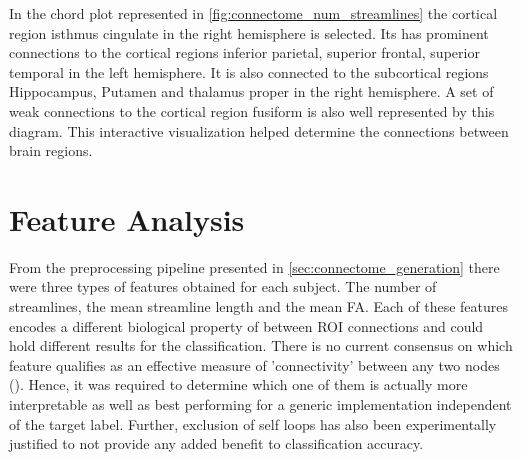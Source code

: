 \documentclass[msthesis.tex]{subfiles}
\begin{document}
In the chord plot represented in \autoref{fig:connectome_num_streamlines} the cortical region isthmus cingulate in the right hemisphere is selected. Its has prominent connections to the cortical regions inferior parietal, superior frontal, superior temporal in the left hemisphere. It is also connected to the subcortical regions Hippocampus, Putamen and thalamus proper in the right hemisphere. A set of weak connections to the cortical region fusiform is also well represented by this diagram. This interactive visualization helped determine the connections between brain regions. 


\section{Feature Analysis}
From the preprocessing pipeline presented in \autoref{sec:connectome_generation} there were three types of features obtained for each subject. The number of streamlines, the mean streamline length and the mean FA. Each of these features encodes a different biological property of between ROI connections and could hold different results for the classification. There is no current consensus on which feature qualifies as an effective measure of 'connectivity' between any two nodes (\cite{yeh2020mapping}). Hence, it was required to determine which one of them is actually more interpretable as well as best performing for a generic implementation independent of the target label. Further, exclusion of self loops has also been experimentally justified to not provide any added benefit to classification accuracy. 
\end{document}
